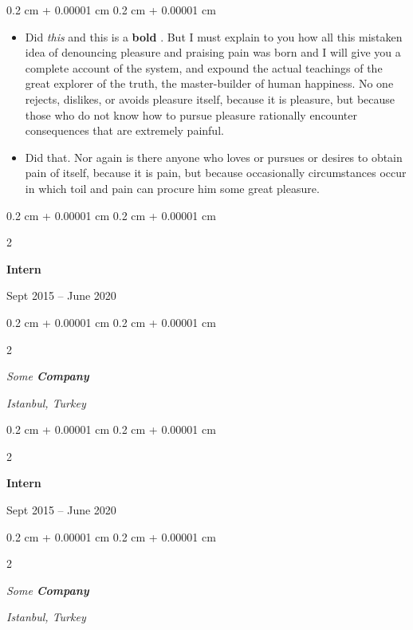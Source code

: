 \documentclass[10pt, letterpaper]{article}
\newenvironment{highlights}{
    \begin{itemize}[
        topsep=0.10 cm,
        parsep=0.10 cm,
        partopsep=0pt,
        itemsep=0pt,
        leftmargin=0.4 cm + 10pt
    ]
}{
    \end{itemize}
} %
\newenvironment{onecolentry}{
    \begin{adjustwidth}{
        0.2 cm + 0.00001 cm
    }{
        0.2 cm + 0.00001 cm
    }
}{
    \end{adjustwidth}
} %
\newenvironment{twocolentry}[2][]{
    \onecolentry
    \def\secondColumn{#2}
    \setcolumnwidth{\fill, 4.5 cm}
    \begin{paracol}{2}
}{
    \switchcolumn \raggedleft \secondColumn
    \end{paracol}
    \endonecolentry
} %
\let\hrefWithoutArrow\href
\renewcommand{\href}[2]{\hrefWithoutArrow{#1}{\ifthenelse{\equal{#2}{}}{ }{#2 }\raisebox{.15ex}{\footnotesize \faExternalLink*}}}
\begin{document}
        \vspace{0.10 cm}
        \begin{onecolentry}
            \begin{highlights}
                \item Did \textit{this} and this is a \textbf{bold} \href{https://example.com}{link}. But I must explain to you how all this mistaken idea of denouncing pleasure and praising pain was born and I will give you a complete account of the system, and expound the actual teachings of the great explorer of the truth, the master-builder of human happiness. No one rejects, dislikes, or avoids pleasure itself, because it is pleasure, but because those who do not know how to pursue pleasure rationally encounter consequences that are extremely painful.
                \item Did that. Nor again is there anyone who loves or pursues or desires to obtain pain of itself, because it is pain, but because occasionally circumstances occur in which toil and pain can procure him some great pleasure.
            \end{highlights}
        \end{onecolentry}


        \vspace{0.2 cm}

                \begin{twocolentry}{
                    Sept 2015 – June 2020
                }
                \textbf{Intern}
                \end{twocolentry}
            \begin{twocolentry}{
        \textit{Istanbul, Turkey}    }
            \textit{Some \textbf{Company}}
            \end{twocolentry}



        \vspace{0.2 cm}

                \begin{twocolentry}{
                    Sept 2015 – June 2020
                }
                \textbf{Intern}
                \end{twocolentry}
            \begin{twocolentry}{
        \textit{Istanbul, Turkey}    }
            \textit{Some \textbf{Company}}
            \end{twocolentry}
\end{document}
